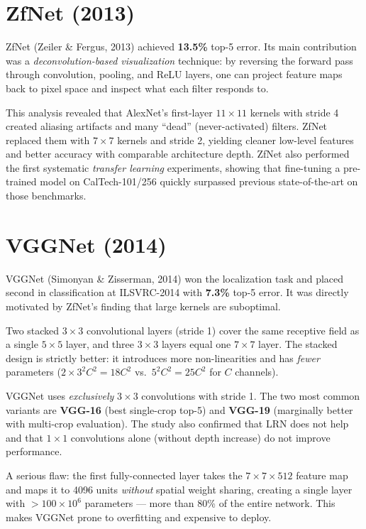 \documentclass[11pt, oneside]{book}
\begin{document}
\section{ZfNet (2013)}

ZfNet (Zeiler \& Fergus, 2013) achieved \textbf{13.5\%} top-5 error.
Its main contribution was a \emph{deconvolution-based visualization} technique:
by reversing the forward pass through convolution, pooling, and ReLU layers,
one can project feature maps back to pixel space and inspect what each filter responds to.

This analysis revealed that AlexNet's first-layer $11\times11$ kernels with stride 4
created aliasing artifacts and many ``dead'' (never-activated) filters.
ZfNet replaced them with $7\times7$ kernels and stride 2,
yielding cleaner low-level features and better accuracy with comparable architecture depth.
ZfNet also performed the first systematic \emph{transfer learning} experiments,
showing that fine-tuning a pre-trained model on CalTech-101/256
quickly surpassed previous state-of-the-art on those benchmarks.

\section{VGGNet (2014)}

VGGNet (Simonyan \& Zisserman, 2014) won the localization task and placed second in
classification at ILSVRC-2014 with \textbf{7.3\%} top-5 error.
It was directly motivated by ZfNet's finding that large kernels are suboptimal.

\begin{thmbox}[title={Receptive-Field Equivalence of Stacked $3\times3$ Kernels}]
Two stacked $3\times3$ convolutional layers (stride 1) cover the same receptive field as
a single $5\times5$ layer, and three $3\times3$ layers equal one $7\times7$ layer.
The stacked design is strictly better: it introduces more non-linearities and has
\emph{fewer} parameters
($2 \times 3^2 C^2 = 18C^2$ vs.\ $5^2 C^2 = 25C^2$ for $C$ channels).
\end{thmbox}

VGGNet uses \emph{exclusively} $3\times3$ convolutions with stride 1.
The two most common variants are \textbf{VGG-16} (best single-crop top-5)
and \textbf{VGG-19} (marginally better with multi-crop evaluation).
The study also confirmed that LRN does not help and that $1\times1$ convolutions
alone (without depth increase) do not improve performance.

A serious flaw: the first fully-connected layer takes the
$7\times7\times512$ feature map and maps it to 4096 units
\emph{without} spatial weight sharing, creating a single layer with
$> 100 \times 10^6$ parameters — more than 80\% of the entire network.
This makes VGGNet prone to overfitting and expensive to deploy.
\end{document}
